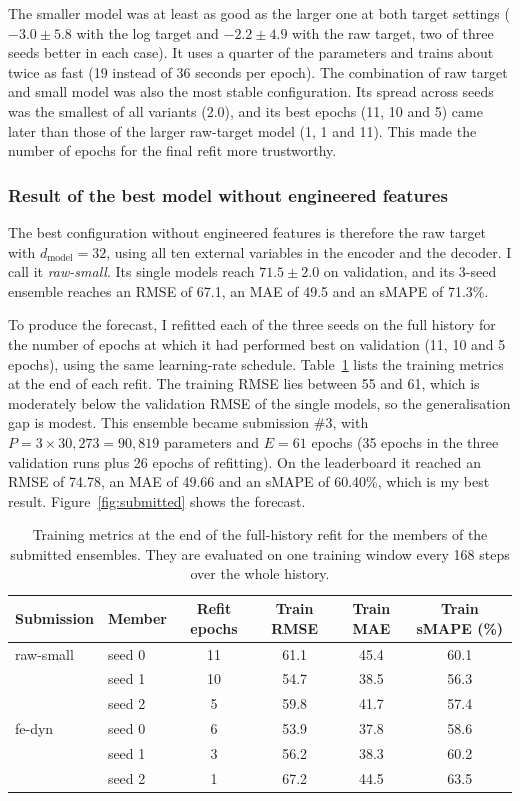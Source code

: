 \documentclass[a4, 12pt]{article}
\begin{document}
The smaller model was at least as good as the larger one at both target settings ($-3.0 \pm 5.8$ with the log target and $-2.2 \pm 4.9$ with the raw target, two of three seeds better in each case). It uses a quarter of the parameters and trains about twice as fast (19 instead of 36 seconds per epoch). The combination of raw target and small model was also the most stable configuration. Its spread across seeds was the smallest of all variants (2.0), and its best epochs (11, 10 and 5) came later than those of the larger raw-target model (1, 1 and 11). This made the number of epochs for the final refit more trustworthy.

\subsubsection{Result of the best model without engineered features}
\label{sec:rawsmall}

The best configuration without engineered features is therefore the raw target with $d_{\text{model}} = 32$, using all ten external variables in the encoder and the decoder. I call it \emph{raw-small}. Its single models reach $71.5 \pm 2.0$ on validation, and its 3-seed ensemble reaches an RMSE of 67.1, an MAE of 49.5 and an sMAPE of 71.3\%.

To produce the forecast, I refitted each of the three seeds on the full history for the number of epochs at which it had performed best on validation (11, 10 and 5 epochs), using the same learning-rate schedule. Table~\ref{tab:refit} lists the training metrics at the end of each refit. The training RMSE lies between 55 and 61, which is moderately below the validation RMSE of the single models, so the generalisation gap is modest. This ensemble became submission \#3, with $P = 3 \times 30{,}273 = 90{,}819$ parameters and $E = 61$ epochs (35 epochs in the three validation runs plus 26 epochs of refitting). On the leaderboard it reached an RMSE of 74.78, an MAE of 49.66 and an sMAPE of 60.40\%, which is my best result. Figure~\ref{fig:submitted} shows the forecast.

\begin{table}[h]
\centering
\caption{Training metrics at the end of the full-history refit for the members of the submitted ensembles. They are evaluated on one training window every 168 steps over the whole history.}
\label{tab:refit}
\small
\begin{tabular}{llcccc}
\toprule
Submission & Member & Refit epochs & Train RMSE & Train MAE & Train sMAPE (\%) \\
\midrule
raw-small & seed 0 & 11 & 61.1 & 45.4 & 60.1 \\
 & seed 1 & 10 & 54.7 & 38.5 & 56.3 \\
 & seed 2 & 5 & 59.8 & 41.7 & 57.4 \\
\midrule
fe-dyn & seed 0 & 6 & 53.9 & 37.8 & 58.6 \\
 & seed 1 & 3 & 56.2 & 38.3 & 60.2 \\
 & seed 2 & 1 & 67.2 & 44.5 & 63.5 \\
\bottomrule
\end{tabular}
\end{table}
\end{document}
